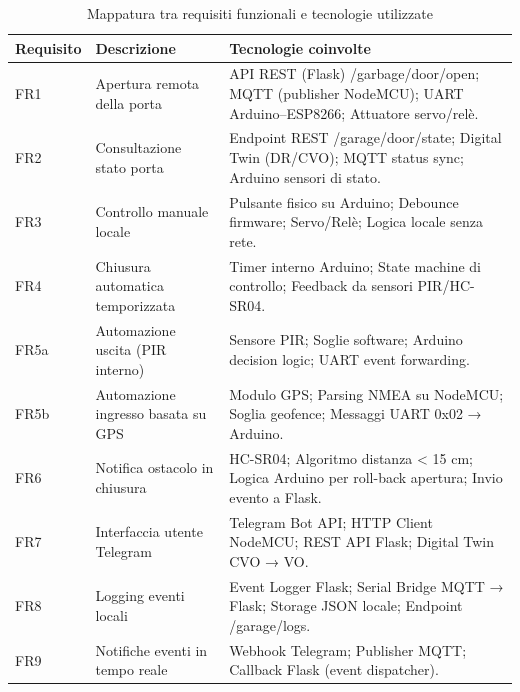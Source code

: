 \begin{table}[H]
\centering
\caption{Mappatura tra requisiti funzionali e tecnologie utilizzate}
\label{tab:fr_tech}
\begin{tabularx}{\textwidth}{@{}l X X@{}}
\toprule
\textbf{Requisito} & \textbf{Descrizione} & \textbf{Tecnologie coinvolte} \\
\midrule

FR1 & Apertura remota della porta &
API REST (Flask) /garbage/door/open;
MQTT (publisher NodeMCU);
UART Arduino--ESP8266;
Attuatore servo/relè. \\

FR2 & Consultazione stato porta &
Endpoint REST /garage/door/state;
Digital Twin (DR/CVO);
MQTT status sync;
Arduino sensori di stato. \\

FR3 & Controllo manuale locale &
Pulsante fisico su Arduino;
Debounce firmware;
Servo/Relè;
Logica locale senza rete. \\

FR4 & Chiusura automatica temporizzata &
Timer interno Arduino;
State machine di controllo;
Feedback da sensori PIR/HC-SR04. \\

FR5a & Automazione uscita (PIR interno) &
Sensore PIR;
Soglie software;
Arduino decision logic;
UART event forwarding. \\

FR5b & Automazione ingresso basata su GPS &
Modulo GPS;
Parsing NMEA su NodeMCU;
Soglia geofence;
Messaggi UART 0x02 → Arduino. \\

FR6 & Notifica ostacolo in chiusura &
HC-SR04;
Algoritmo distanza < 15 cm;
Logica Arduino per roll-back apertura;
Invio evento a Flask. \\

FR7 & Interfaccia utente Telegram &
Telegram Bot API;
HTTP Client NodeMCU;
REST API Flask;
Digital Twin CVO → VO. \\

FR8 & Logging eventi locali &
Event Logger Flask;
Serial Bridge MQTT → Flask;
Storage JSON locale;
Endpoint /garage/logs. \\

FR9 & Notifiche eventi in tempo reale &
Webhook Telegram;
Publisher MQTT;
Callback Flask (event dispatcher). \\

\bottomrule
\end{tabularx}
\end{table}


